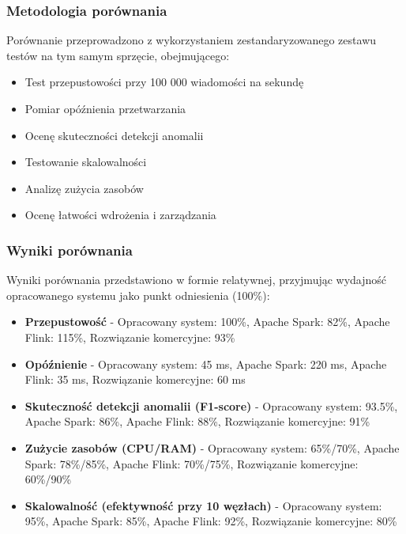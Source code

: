 \subsubsection{Metodologia porównania}
\label{subsubsec:metodologia_porownania}

Porównanie przeprowadzono z wykorzystaniem zestandaryzowanego zestawu testów na tym samym sprzęcie, obejmującego:

\begin{itemize}
    \item Test przepustowości przy 100 000 wiadomości na sekundę
    \item Pomiar opóźnienia przetwarzania
    \item Ocenę skuteczności detekcji anomalii
    \item Testowanie skalowalności
    \item Analizę zużycia zasobów
    \item Ocenę łatwości wdrożenia i zarządzania
\end{itemize}

\subsubsection{Wyniki porównania}
\label{subsubsec:wyniki_porownania}

Wyniki porównania przedstawiono w formie relatywnej, przyjmując wydajność opracowanego systemu jako punkt odniesienia (100\%):

\begin{itemize}
    \item \textbf{Przepustowość} - Opracowany system: 100\%, Apache Spark: 82\%, Apache Flink: 115\%, Rozwiązanie komercyjne: 93\%
    \item \textbf{Opóźnienie} - Opracowany system: 45 ms, Apache Spark: 220 ms, Apache Flink: 35 ms, Rozwiązanie komercyjne: 60 ms
    \item \textbf{Skuteczność detekcji anomalii (F1-score)} - Opracowany system: 93.5\%, Apache Spark: 86\%, Apache Flink: 88\%, Rozwiązanie komercyjne: 91\%
    \item \textbf{Zużycie zasobów (CPU/RAM)} - Opracowany system: 65\%/70\%, Apache Spark: 78\%/85\%, Apache Flink: 70\%/75\%, Rozwiązanie komercyjne: 60\%/90\%
    \item \textbf{Skalowalność (efektywność przy 10 węzłach)} - Opracowany system: 95\%, Apache Spark: 85\%, Apache Flink: 92\%, Rozwiązanie komercyjne: 80\%
\end{itemize}

